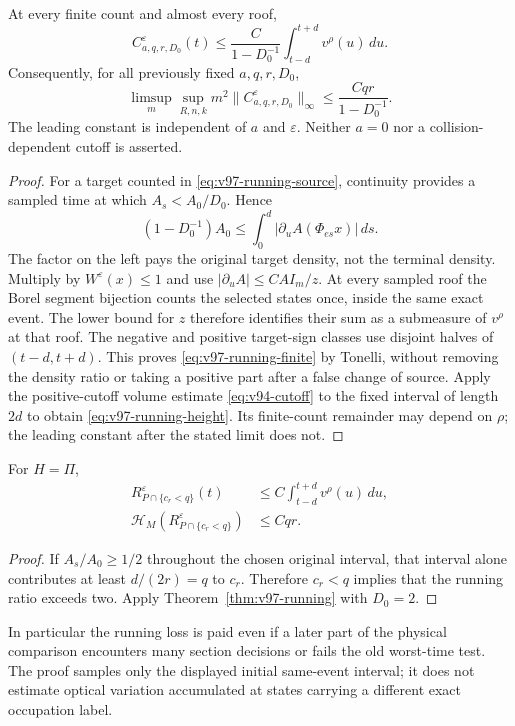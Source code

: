 \begin{theorem}
\label{thm:v97-running}
At every finite count and almost every roof,
\begin{equation}\label{eq:v97-running-finite}
 C_{a,q,r,D_0}^\varepsilon(t)
 \le\frac C{1-D_0^{-1}}\int_{t-d}^{t+d}v^\rho(u)\,du.
\end{equation}
Consequently, for all previously fixed $a,q,r,D_0$,
\begin{equation}\label{eq:v97-running-height}
 \limsup_m\sup_{R,n,k}m^2\|C_{a,q,r,D_0}^\varepsilon\|_\infty
 \le\frac{Cqr}{1-D_0^{-1}}.
\end{equation}
The leading constant is independent of $a$ and $\varepsilon$.
Neither $a=0$ nor a collision-dependent cutoff is asserted.
\end{theorem}
\begin{proof}
For a target counted in \eqref{eq:v97-running-source}, continuity
provides a sampled time at which $A_s<A_0/D_0$. Hence
\[
 (1-D_0^{-1})A_0\le\int_0^d
                  |\partial_u A(\Phi_{es}x)|\,ds.
\]
The factor on the left pays the original target density, not the
terminal density. Multiply by $W^\varepsilon(x)\le1$ and use
$|\partial_uA|\le CAI_m/z$. At every sampled roof the Borel
segment bijection counts the selected states once, inside the same
exact event. The lower bound for $z$ therefore identifies their
sum as a submeasure of $v^\rho$ at that roof. The negative and
positive target-sign classes use disjoint halves of $(t-d,t+d)$.
This proves \eqref{eq:v97-running-finite} by Tonelli, without
removing the density ratio or taking a positive part after a false
change of source. Apply the positive-cutoff volume estimate
\eqref{eq:v94-cutoff} to the fixed interval of length $2d$ to obtain
\eqref{eq:v97-running-height}. Its finite-count remainder may depend
on $\rho$; the leading constant after the stated limit does not.
\end{proof}

\begin{corollary}
\label{cor:v97-low-clock}
For $H=\Pi$,
\begin{align}
 R_{P\cap\{c_r<q\}}^\varepsilon(t)
       &\le C\int_{t-d}^{t+d}v^\rho(u)\,du,
                                      \label{eq:v97-low-clock-finite}\\
 \mathcal H_M(R_{P\cap\{c_r<q\}}^\varepsilon)&\le Cqr.
                                      \label{eq:v97-low-clock-height}
\end{align}
\end{corollary}
\begin{proof}
If $A_s/A_0\ge1/2$ throughout the chosen original interval, that
interval alone contributes at least $d/(2r)=q$ to $c_r$. Therefore
$c_r<q$ implies that the running ratio exceeds two. Apply
Theorem~\ref{thm:v97-running} with $D_0=2$.
\end{proof}

In particular the running loss is paid even if a later part of the
physical comparison encounters many section decisions or fails the
old worst-time test. The proof samples only the displayed initial
same-event interval; it does not estimate optical variation accumulated
at states carrying a different exact occupation label.
